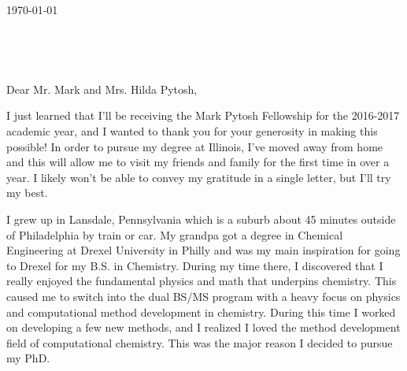\documentclass[11pt,a4paper]{letter} %
\def\opening#1{\thispagestyle{empty}
{\centering\fromaddress \vspace{0.6in} \\ %
\hspace*{\longindentation}\hspace*{\fill}\par} %
{\raggedright \toname \\ \toaddress \par} %
\vspace{0.4in} %
\noindent #1 %
}
\begin{document}

\begin{letter}
{\today}


\opening{Dear Mr. Mark and Mrs. Hilda Pytosh,}

I just learned that I'll be receiving the Mark Pytosh Fellowship for the 2016-2017 academic year, and I wanted to thank you for your generosity in making this possible! In order to pursue my degree at Illinois, I've moved away from home and this will allow me to visit my friends and family for the first time in over a year. I likely won't be able to convey my gratitude in a single letter, but I'll try my best. 

 I grew up in Lansdale, Pennsylvania which is a suburb about 45 minutes outside of Philadelphia by train or car. My grandpa got a degree in Chemical Engineering at Drexel University in Philly and was my main inspiration for going to Drexel for my B.S. in Chemistry. During my time there, I discovered that I really enjoyed the fundamental physics and math that underpins chemistry. This caused me to switch into the dual BS/MS program with a heavy focus on physics and computational method development in chemistry. During this time I worked on developing a few new methods, and I realized I loved the method development field of computational chemistry. This was the major reason I decided to pursue my PhD. 


\end{letter}
\end{document}
